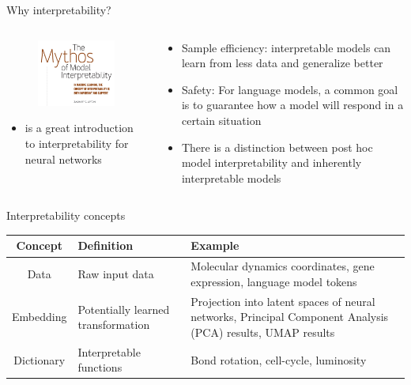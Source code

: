\begin{frame}{Why interpretability?}
\begin{columns}
\begin{column}{.33\textwidth}
\begin{figure}
    \includegraphics[width=4cm]{img/zipton.png}
\end{figure}
\begin{itemize}
    \item \citet{Molnar2023-le} is a great introduction to interpretability for neural networks
\end{itemize}
\end{column}
\begin{column}{.5\textwidth}
\begin{itemize}
    \item Sample efficiency: interpretable models can learn from less data and generalize better
    \item Safety: For language models, a common goal is to guarantee how a model will respond in a certain situation
    \item There is a distinction between post hoc model interpretability and inherently interpretable models
\end{itemize}
\end{column}
\end{columns}
\end{frame}

\begin{frame}[fragile]{Interpretability concepts}
\centering
\begin{figure}[H]
    \centering
{}
    \label{fig:summary}
\end{figure}
\begin{table}[H]
\scriptsize
\centering
\begin{tabular}{|c|p{3cm}|p{5cm}|}
\hline
\textbf{Concept} & \textbf{Definition} & \textbf{Example} \\
\hline
Data & Raw input data & Molecular dynamics coordinates, gene expression, language model tokens \\
Embedding & Potentially learned transformation & Projection into latent spaces of neural networks, Principal Component Analysis (PCA) results, UMAP results \\
Dictionary & Interpretable functions & Bond rotation, cell-cycle, luminosity \\
\hline
\end{tabular}
\label{tab:concept_examples}
\end{table}
\end{frame}


